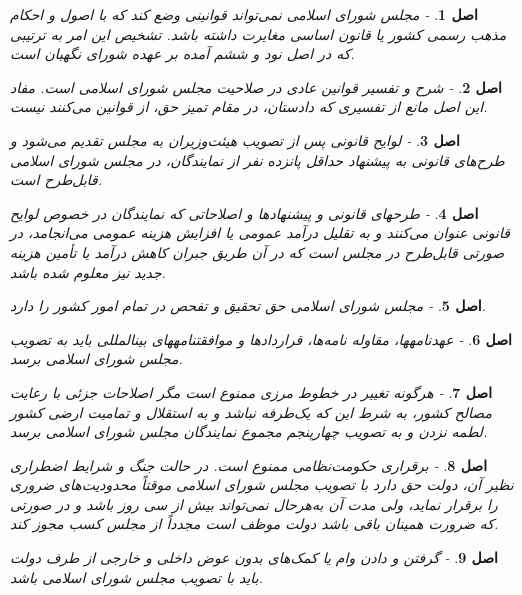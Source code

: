 \documentclass[12pt]{article}
\newtheorem{asl}{اصل}
\begin{document}
\begin{asl}- 
مجلس شورای اسلامی نمی‌تواند قوانینی وضع کند که با اصول و احکام مذهب رسمی کشور یا قانون اساسی مغایرت داشته باشد. تشخیص این امر به ترتیبی که در اصل نود و ششم آمده بر عهده شورای نگهبان است.  
\end{asl}

\begin{asl}- 
شرح و تفسیر قوانین عادی در صلاحیت مجلس شورای اسلامی است. مفاد این اصل مانع از تفسیری که دادستان، در مقام تمیز حق، از قوانین می‌کنند نیست. 
\end{asl}

\begin{asl}- 
لوایح قانونی پس از تصویب هیئت‌وزیران به مجلس تقدیم می‌شود و طرح‌های قانونی به پیشنهاد حداقل پانزده نفر از نمایندگان، در مجلس شورای اسلامی قابل‌طرح است. 
\end{asl}

\begin{asl}- 
طرح‏های قانونی و پیشنهادها و اصلاحاتی که نمایندگان در خصوص لوایح قانونی عنوان می‌کنند و به تقلیل درآمد عمومی یا افزایش هزینه عمومی می‌انجامد، در صورتی قابل‌طرح در مجلس است که در آن طریق جبران کاهش درآمد یا تأمین هزینه جدید نیز معلوم شده باشد. 
\end{asl}

\begin{asl}- 
مجلس شورای اسلامی حق تحقیق و تفحص در تمام امور کشور را دارد. 
\end{asl}

\begin{asl}- 
عهدنامه‏ها، مقاوله نامه‌ها، قراردادها و موافقت‏نامه‏‏های بین‏المللی باید به تصویب مجلس شورای اسلامی برسد. 
\end{asl}

\begin{asl}- 
هرگونه تغییر در خطوط مرزی ممنوع است مگر اصلاحات جزئی با رعایت مصالح کشور، به شرط این که یک‌طرفه نباشد و به استقلال و تمامیت ارضی کشور لطمه نزدن و به تصویب چهارپنجم مجموع نمایندگان مجلس شورای اسلامی برسد. 
\end{asl}

\begin{asl}- 
برقراری حکومت‌نظامی ممنوع است. در حالت جنگ و شرایط اضطراری نظیر آن، دولت حق دارد با تصویب مجلس شورای اسلامی موقتاً محدودیت‌های ضروری را برقرار نماید، ولی مدت آن به‌هرحال نمی‌تواند بیش از سی روز باشد و در صورتی که ضرورت همینان باقی باشد دولت موظف است مجدداً از مجلس کسب مجوز کند. 
\end{asl}

\begin{asl}- 
گرفتن و دادن وام یا کمک‌های بدون عوض داخلی و خارجی از طرف دولت باید با تصویب مجلس شورای اسلامی باشد. 
\end{asl}
\end{document}
